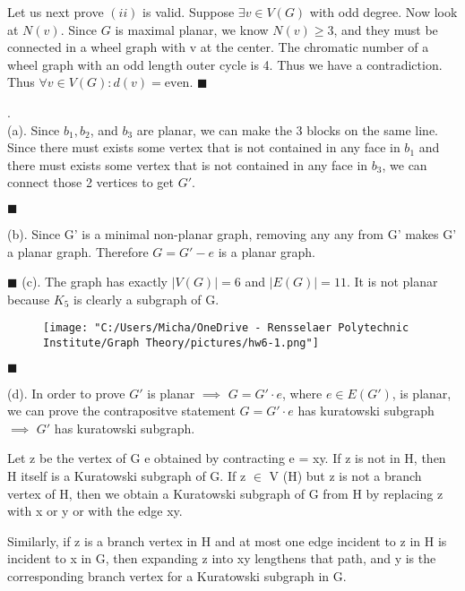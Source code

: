 \documentclass[12pt]{article}
\begin{document}
	Let us next prove $(ii)$ is valid. Suppose $\exists v \in V(G)$ with odd degree. Now look at $N(v)$. Since $G$ is maximal planar, we know $N(v) \geq 3$, and they must be connected in a wheel graph with v at the center. The chromatic number of a wheel graph with an odd length outer cycle is 4. Thus we have a contradiction. Thus $\forall v \in V(G) : d(v) = \text{even}$.
		\hfill $\blacksquare$
		
	. \\
	
	(a). Since $b_1,b_2$, and $b_3$ are planar, we can make the 3 blocks on the same line. Since there must exists some vertex that is not contained in any face in $b_1$ and there must exists some vertex that is not contained in any face in $b_3$, we can connect those 2 vertices to get $G'$.
	
	\hfill $\blacksquare$
	
	(b). Since G' is a minimal non-planar graph, removing any any from G' makes G' a planar graph. Therefore $G = G' - e$ is a planar graph.
	
	\hfill $\blacksquare$
	\newpage
	(c). The graph has exactly $|V(G)| = 6$ and $|E(G)| = 11$. It is not planar because $K_5$ is clearly a subgraph of G.
			\begin{figure}[h]
				\begin{center}
						\texttt{[image: "C:/Users/Micha/OneDrive - Rensselaer Polytechnic Institute/Graph Theory/pictures/hw6-1.png"]}\\
				\end{center}
		
		\end{figure}
	
	\hfill $\blacksquare$
	 
	
	(d). In order to prove $G'$ is planar $\implies$ $G=G' \cdot e$, where $e \in E(G')$, is planar, we can prove the contrapositve statement $G = G' \cdot e$ has kuratowski subgraph $\implies$ $G'$ has kuratowski subgraph.
	
	Let z be the vertex of G e obtained by contracting e = xy. If z is not in H, then H itself is a Kuratowski subgraph of G. If z $\in$ V (H) but z is not a branch vertex of H, then we obtain a Kuratowski subgraph of G from H by replacing z with x or y or with the edge xy.
	
	Similarly, if z is a branch vertex in H and at most one edge incident to z in H is incident to x in G, then expanding z into xy lengthens that path, and y is the corresponding branch vertex for a Kuratowski subgraph in G.
	
\end{document}
